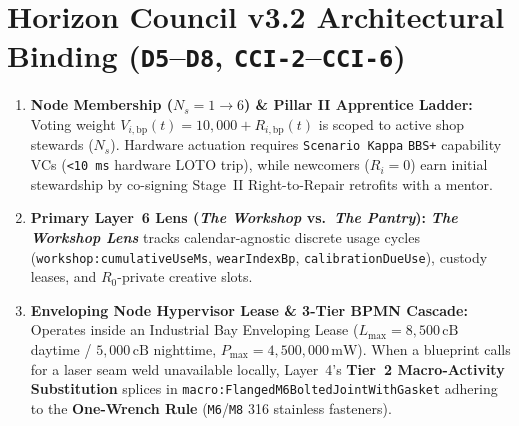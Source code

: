 \section{Horizon Council v3.2 Architectural Binding (\texttt{D5}--\texttt{D8}, \texttt{CCI-2}--\texttt{CCI-6})}
\begin{enumerate}
    \item \textbf{Node Membership ($N_s = 1 \to 6$) \& Pillar II Apprentice Ladder:} Voting weight $V_{i,\mathrm{bp}}(t) = 10{,}000 + R_{i,\mathrm{bp}}(t)$ is scoped to active shop stewards ($N_s$). Hardware actuation requires \texttt{Scenario Kappa} \texttt{BBS+} capability VCs (\texttt{<10 ms} hardware LOTO trip), while newcomers ($R_i = 0$) earn initial stewardship by co-signing Stage~II Right-to-Repair retrofits with a mentor.
    \item \textbf{Primary Layer~6 Lens (\textit{The Workshop} vs.\ \textit{The Pantry}):} \textbf{\textit{The Workshop Lens}} tracks calendar-agnostic discrete usage cycles (\texttt{workshop:cumulativeUseMs}, \texttt{wearIndexBp}, \texttt{calibrationDueUse}), custody leases, and $R_0$-private creative slots.
    \item \textbf{Enveloping Node Hypervisor Lease \& 3-Tier BPMN Cascade:} Operates inside an Industrial Bay Enveloping Lease ($L_{\max} = 8{,}500\,\mathrm{cB}$ daytime / $5{,}000\,\mathrm{cB}$ nighttime, $P_{\max} = 4{,}500{,}000\,\mathrm{mW}$). When a blueprint calls for a laser seam weld unavailable locally, Layer~4's \textbf{Tier~2 Macro-Activity Substitution} splices in \texttt{macro:FlangedM6BoltedJointWithGasket} adhering to the \textbf{One-Wrench Rule} (\texttt{M6}/\texttt{M8} 316 stainless fasteners).
\end{enumerate}


